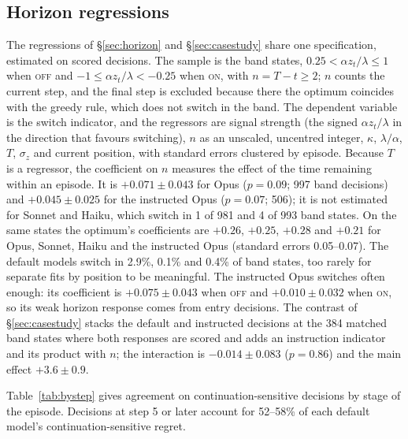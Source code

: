 \documentclass[10pt,a4paper,twocolumn]{article}
\newcommand{\ON}{\textsc{on}}
\newcommand{\OFF}{\textsc{off}}
\newcommand{\sigz}{\sigma_z}
\begin{document}
\subsection{Horizon regressions}\label{app:verify-horizon}
The regressions of \S\ref{sec:horizon} and \S\ref{sec:casestudy} share one specification, estimated on scored decisions. The sample is the band states, $0.25<\alpha z_t/\lambda\le1$ when \OFF{} and $-1\le\alpha z_t/\lambda<-0.25$ when \ON{}, with $n=T-t\ge2$; $n$ counts the current step, and the final step is excluded because there the optimum coincides with the greedy rule, which does not switch in the band. The dependent variable is the switch indicator, and the regressors are signal strength (the signed $\alpha z_t/\lambda$ in the direction that favours switching), $n$ as an unscaled, uncentred integer, $\kappa$, $\lambda/\alpha$, $T$, $\sigz$ and current position, with standard errors clustered by episode. Because $T$ is a regressor, the coefficient on $n$ measures the effect of the time remaining within an episode. It is $+0.071\pm0.043$ for Opus ($p{=}0.09$; 997 band decisions) and $+0.045\pm0.025$ for the instructed Opus ($p{=}0.07$; 506); it is not estimated for Sonnet and Haiku, which switch in 1 of 981 and 4 of 993 band states. On the same states the optimum's coefficients are $+0.26$, $+0.25$, $+0.28$ and $+0.21$ for Opus, Sonnet, Haiku and the instructed Opus (standard errors 0.05--0.07). The default models switch in 2.9\%, 0.1\% and 0.4\% of band states, too rarely for separate fits by position to be meaningful. The instructed Opus switches often enough: its coefficient is $+0.075\pm0.043$ when \OFF{} and $+0.010\pm0.032$ when \ON{}, so its weak horizon response comes from entry decisions. The contrast of \S\ref{sec:casestudy} stacks the default and instructed decisions at the 384 matched band states where both responses are scored and adds an instruction indicator and its product with $n$; the interaction is $-0.014\pm0.083$ ($p{=}0.86$) and the main effect $+3.6\pm0.9$.

Table~\ref{tab:bystep} gives agreement on continuation-sensitive decisions by stage of the episode. Decisions at step 5 or later account for 52--58\% of each default model's continuation-sensitive regret.
\begin{center}\scriptsize\setlength{\tabcolsep}{3pt}
\label{tab:bystep}
\end{center}
\end{document}
